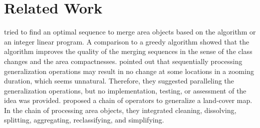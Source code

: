 \documentclass[]{interact}
\begin{document}
\section{Related Work}
\label{sec:realted_work}


\citet[]{Peng2019Thesis} tried to 
find an optimal sequence to merge area objects 
based on the \Astar algorithm or an integer linear program.
A comparison to a greedy algorithm showed that 
the \Astar algorithm improves the quality of the merging sequences
in the sense of the class changes and the area compactnesses.
 pointed out that 
sequentially processing generalization operations 
may result in no change at some locations in a zooming duration, 
which seems unnatural.
Therefore, they suggested paralleling the generalization operations,
but no implementation, testing, or assessment of the idea was provided.
\citet{Thiemann2018LandCover} proposed a chain of operators 
to generalize a land-cover map.
In the chain of processing area objects, 
they integrated cleaning, dissolving, splitting, 
aggregating, reclassifying, and simplifying. 
\end{document}
